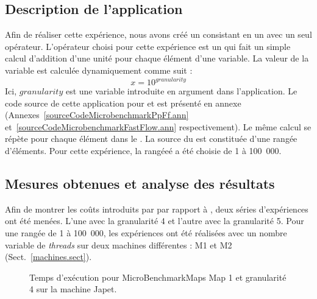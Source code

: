 \subsection{Description de l'application}

Afin de r\'ealiser cette exp\'erience, nous avons cr\'e\'e un  consistant en un  avec un seul op\'erateur. L'op\'erateur choisi pour cette exp\'erience est un  qui fait un simple calcul d'addition d'une unit\'e pour chaque \'el\'ement d'une variable. La valeur de la variable est calcul\'ee dynamiquement comme suit : \[ x = 10^{granularity} \] 
Ici, $granularity$ est une variable introduite en argument dans l'application. Le code source de cette application pour  et  est pr\'esent\'e en annexe (Annexes~\ref{sourceCodeMicrobenchmarkPpFf.ann} et~\ref{sourceCodeMicrobenchmarkFastFlow.ann} respectivement). Le m\^eme calcul se r\'ep\`ete pour chaque \'el\'ement dans le . La source du  est constitu\'ee d'une rang\'ee d'\'el\'ements. Pour cette exp\'erience, la rangée\'e a \'et\'e choisie de 1 \`a 100~000.  


\subsection{Mesures obtenues et analyse des r\'esultats}

Afin de montrer les co\^uts introduits par \PpFf{} par rapport \`a , deux s\'eries d'exp\'eriences ont \'et\'e men\'ees. L'une avec la granularit\'e 4 et l'autre avec la granularit\'e 5. Pour une rang\'ee de 1 \`a 100~000, les exp\'eriences ont \'et\'e r\'ealis\'ees avec un nombre variable de \emph{threads} sur deux machines diff\'erentes : M1 et M2 (Sect.~\ref{machines.sect}).  

\begin{figure}[H]
\centering
    \caption{Temps d'ex\'ecution pour MicroBenchmarkMaps Map 1 et granularit\'e 4 sur la machine Japet.}
    \label{JapetExecutionMicroBenchmarkGr4.fig}	
\end{figure}





